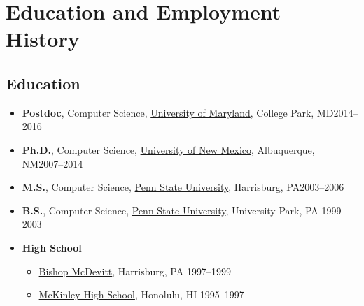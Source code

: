 \documentclass[11pt]{article}
\begin{document}
\section{Education and Employment History}

\subsection{Education}

\begin{itemize}
\item \textbf{Postdoc}, Computer Science,  \href{https://www.umd.edu}{University of Maryland}, College Park, MD\hfill 2014--2016
  
\item \textbf{Ph.D.}, Computer Science,  \href{https://www.unm.edu}{University of New Mexico}, Albuquerque, NM\hfill 2007--2014

\item \textbf{M.S.}, Computer Science,  \href{https://www.hbg.psu.edu}{Penn State University}, Harrisburg, PA\hfill 2003--2006
  
\item \textbf{B.S.}, Computer Science, \href{https://www.psu.edu}{Penn State University}, University Park, PA \hfill 1999--2003
  \vspace{0.1in}
\item \textbf{High School}
  \begin{itemize}
  \item \href{https://www.bishopmcdevitt.org/mcd/}{Bishop McDevitt}, Harrisburg, PA \hfill 1997--1999
  \item \href{https://www.mckinley.k12.hi.us/}{McKinley High School}, Honolulu, HI \hfill 1995--1997  
\end{itemize}
\end{itemize}
\end{document}
